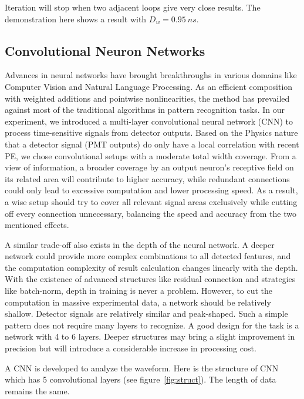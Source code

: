 Iteration will stop when two adjacent loops give very close results. The demonstration here shows a result with $D_w = \SI{0.95}{ns}$. 

\subsection{Convolutional Neuron Networks}

Advances in neural networks have brought breakthroughs in various domains like Computer Vision and Natural Language Processing. As an efficient composition with weighted additions and pointwise nonlinearities, the method has prevailed against most of the traditional algorithms in pattern recognition tasks. In our experiment, we introduced a multi-layer convolutional neural network (CNN) to process time-sensitive signals from detector outputs. Based on the Physics nature that a detector signal (PMT outputs) do only have a local correlation with recent PE, we chose convolutional setups with a moderate total width coverage. From a view of information, a broader coverage by an output neuron's receptive field on its related area will contribute to higher accuracy, while redundant connections could only lead to excessive computation and lower processing speed. As a result, a wise setup should try to cover all relevant signal areas exclusively while cutting off every connection unnecessary, balancing the speed and accuracy from the two mentioned effects.

A similar trade-off also exists in the depth of the neural network. A deeper network could provide more complex combinations to all detected features, and the computation complexity of result calculation changes linearly with the depth. With the existence of advanced structures like residual connection and strategies like batch-norm, depth in training is never a problem. However, to cut the computation in massive experimental data, a network should be relatively shallow. Detector signals are relatively similar and peak-shaped. Such a simple pattern does not require many layers to recognize. A good design for the task is a network with 4 to 6 layers. Deeper structures may bring a slight improvement in precision but will introduce a considerable increase in processing cost.

A CNN is developed to analyze the waveform. Here is the structure of CNN which has 5 convolutional layers (see figure~\ref{fig:struct}). The length of data remains the same. 


